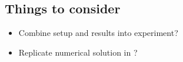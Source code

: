 \documentclass{article}
\begin{document}
\begin{multicols}{2}
\section{Things to consider}
\begin{itemize}
\item Combine setup and results into experiment?
\item Replicate numerical solution in \cite{harris_polarization_2006}?
\end{itemize}




\end{multicols}
\end{document}
